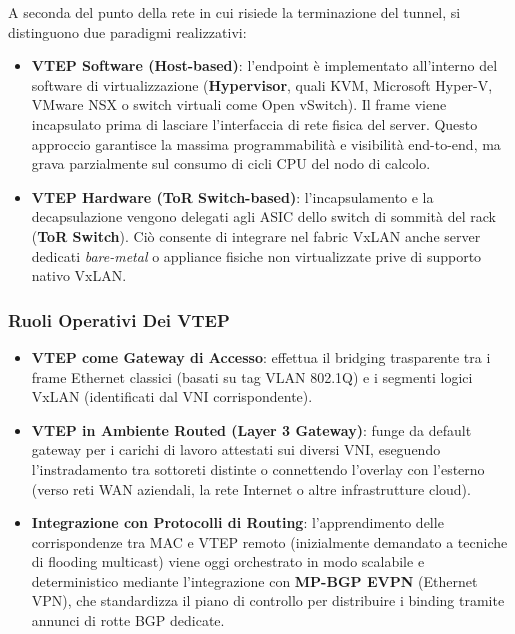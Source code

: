 \documentclass[11pt, a4paper]{article}
\begin{document}

A seconda del punto della rete in cui risiede la terminazione del tunnel, si distinguono due paradigmi realizzativi:
\begin{itemize}[noitemsep]
    \item \textbf{VTEP Software (Host-based)}: l'endpoint è implementato all'interno del software di virtualizzazione (\textbf{Hypervisor}, quali KVM, Microsoft Hyper-V, VMware NSX o switch virtuali come Open vSwitch). Il frame viene incapsulato prima di lasciare l'interfaccia di rete fisica del server. Questo approccio garantisce la massima programmabilità e visibilità end-to-end, ma grava parzialmente sul consumo di cicli CPU del nodo di calcolo.
    \item \textbf{VTEP Hardware (ToR Switch-based)}: l'incapsulamento e la decapsulazione vengono delegati agli ASIC dello switch di sommità del rack (\textbf{ToR Switch}). Ciò consente di integrare nel fabric VxLAN anche server dedicati \emph{bare-metal} o appliance fisiche non virtualizzate prive di supporto nativo VxLAN.
\end{itemize}

\subsubsection{Ruoli Operativi Dei VTEP}
\begin{itemize}[noitemsep]
    \item \textbf{VTEP come Gateway di Accesso}: effettua il bridging trasparente tra i frame Ethernet classici (basati su tag VLAN 802.1Q) e i segmenti logici VxLAN (identificati dal VNI corrispondente).
    \item \textbf{VTEP in Ambiente Routed (Layer 3 Gateway)}: funge da default gateway per i carichi di lavoro attestati sui diversi VNI, eseguendo l'instradamento tra sottoreti distinte o connettendo l'overlay con l'esterno (verso reti WAN aziendali, la rete Internet o altre infrastrutture cloud).
    \item \textbf{Integrazione con Protocolli di Routing}: l'apprendimento delle corrispondenze tra MAC e VTEP remoto (inizialmente demandato a tecniche di flooding multicast) viene oggi orchestrato in modo scalabile e deterministico mediante l'integrazione con \textbf{MP-BGP EVPN} (Ethernet VPN), che standardizza il piano di controllo per distribuire i binding tramite annunci di rotte BGP dedicate.
\end{itemize}
\end{document}
